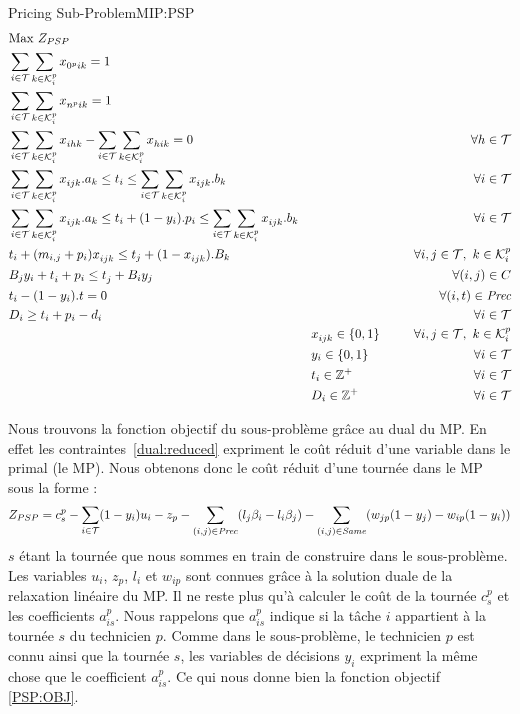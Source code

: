 \begin{modelIP}{Pricing Sub-Problem}{MIP:PSP}
\footnotesize
\begin{align}
&\text{Max  } Z_{PSP} && &&&  \label{PSP:OBJ}\\
&\sum_{i \in \mathcal{T}}\sum_{k \in \mathcal{K}_{i}^{p}} x_{0^pik}^{} = 1 &&   &&&\\
&\sum_{i \in \mathcal{T}}\sum_{k \in \mathcal{K}_{i}^{p}} x_{n^pik}^{} = 1 &&  &&& \\
&\sum_{i \in \mathcal{T}}\sum_{k \in \mathcal{K}_{i}^{p}} x_{ihk}^{} - \sum_{i \in \mathcal{T}}\sum_{k \in \mathcal{K}_{i}^{p}} x_{hik}^{} = 0 && &&&  \forall h \in \mathcal{T} \\
&\sum_{i \in \mathcal{T}}\sum_{k \in \mathcal{K}_{i}^{p}} x_{ijk}^{}.a_k \leq t_i \leq \sum_{i \in \mathcal{T}}\sum_{k \in \mathcal{K}_{i}^{p}} x_{ijk}^{}.b_k && &&&  \forall i \in \mathcal{T} \\
&\sum_{i \in \mathcal{T}}\sum_{k \in \mathcal{K}_{i}^{p}} x_{ijk}^{}.a_k \leq t_i + (1-y_{i}).p_i \leq \sum_{i \in \mathcal{T}}\sum_{k \in \mathcal{K}_{i}^{p}} x_{ijk}^{}.b_k &&  &&& \forall i\in \mathcal{T}\\
&t_i + (m_{i,j} + p_i)x_{ijk}^{} \leq t_j + (1-x_{ijk}^{}).B_k &&   &&&\forall i,j \in \mathcal{T}, ~ k \in \mathcal{K}_{i}^{p} \\
&B_jy_{i} + t_{i}^{} + p_i \leq t_{j}^{} +B_iy_{j} && &&& \forall (i,j) \in C \\
&t_i - (1-y_{i}).t = 0 && &&& \forall (i,t) \in \textit{Prec}\\
&D_{i} \geq t_i +p_i - d_i && &&& \forall i \in \mathcal{T} \\
& && x_{ijk}^{} \in \{0,1\}~~&&& \forall i,j \in \mathcal{T} , ~ k \in \mathcal{K}_{i}^{p} \\
& && y_{i} \in  \{0,1\} ~~&&& \forall i \in \mathcal{T}\\
& && t_i \in \mathbb{Z}^+ ~~&&& \forall i \in \mathcal{T}\\
& && D_{i} \in \mathbb{Z}^+ ~~&&& \forall i \in \mathcal{T}
\end{align}
\end{modelIP}

Nous trouvons la fonction objectif du sous-problème grâce au dual du MP. 
En effet les contraintes~\eqref{dual:reduced} expriment le coût réduit d'une variable dans le primal (le MP).
Nous obtenons donc le coût réduit d'une tournée dans le MP sous la forme :
$$
Z_{PSP} = c^p_{s} -\sum_{i \in \mathcal{T}}(1-y_{i})u_{i} -z_{p} - \sum\limits_{(i,j)\in\textit{Prec}}(l_j\beta_i - l_i\beta_j) - \sum\limits_{(i,j)\in\textit{Same}}(w_{jp}(1-y_{j}) - w_{ip}(1-y_{i}))
$$
$s$ étant la tournée que nous sommes en train de construire dans le sous-problème.
Les variables $u_i$, $z_p$, $l_i$ et $w_{ip}$ sont connues grâce à la solution duale de la relaxation linéaire du MP.
Il ne reste plus qu'à calculer le coût de la tournée $c_s^p$ et les coefficients $a_{is}^p$.
Nous rappelons que $a_{is}^p$ indique si la tâche $i$ appartient à la tournée $s$ du technicien $p$.
Comme dans le sous-problème, le technicien $p$ est connu ainsi que la tournée $s$, les variables de décisions $y_i$ expriment la même chose que le coefficient $a_{is}^p$.
Ce qui nous donne bien la fonction objectif \eqref{PSP:OBJ}.

